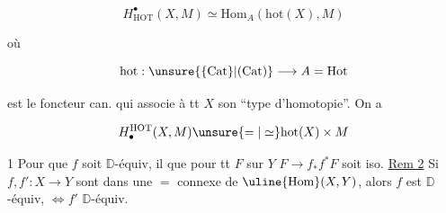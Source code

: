 \[ H^\bullet_{\mathrm{HOT}}(X,M)\simeq\mathrm{Hom}_A(\mathrm{hot}(X),M) \]

où

\[ \mathrm{hot}:\unsure{\{\mathrm{Cat}\}|\mathrm{(Cat)}}\longrightarrow A=\mathrm{Hot} \]

est le foncteur  can. qui associe à tt $X$ son ``type d'homotopie''. On a

\[ H_\bullet^{\mathrm{HOT}}(X,M)\unsure{=|\simeq}\mathrm{hot}(X)\times M \]

  1 Pour que $f$ soit $\mathbb D$-équiv, il  que pour tt $F$  sur $Y$  $F\longrightarrow f_*f^*F$ soit iso. \uline{Rem 2} Si $f,f':X\longrightarrow Y$ sont dans une $=$  connexe de $\uline{\mathrm{Hom}}(X,Y)$, alors $f$ est $\mathbb D$-équiv, $\Leftrightarrow f'$ $\mathbb D$-équiv.
